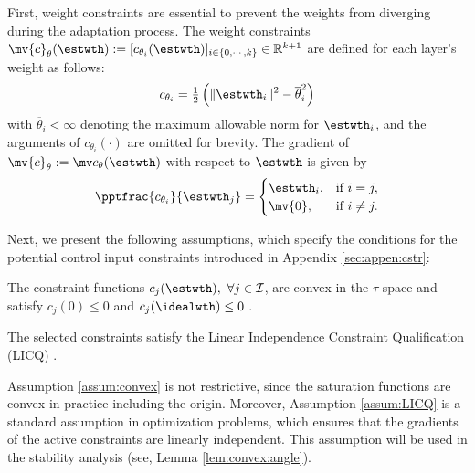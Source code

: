 \documentclass[lettersize,journal]{IEEEtran}
\begin{document}
First, weight constraints are essential to prevent the weights from diverging during the adaptation process.
The weight constraints $\mv{c}_{\theta}(\estwth):= [c_{\theta_i}(\estwth)]_{i\in\{0,\cdots ,k\}}\in\mathbb R^{k+1}$ are defined for each layer's weight as follows:
\begin{equation}
    c_{\theta_i}
    =
    \tfrac{1}{2}
    \left(
        \Vert \estwth_i\Vert^2 
        -
        \overline\theta_i^2 
    \right)    
    \label{eq:cstr:weight:ball}
\end{equation}
with $\overline\theta_i<\infty$ denoting the maximum allowable norm for $\estwth_i$, and the arguments of $c_{\theta_i}(\cdot)$ are omitted for brevity.
The gradient of $\mv{c}_\theta:=\mv c_{\theta}(\estwth)$ with respect to $\estwth$ is given by
\begin{equation}
    \pptfrac{c_{\theta_i}}{\estwth_j} 
    =
    \begin{cases}
        \estwth_i,
        &
        \text{if } i=j,
        \\
        \mv{0},
        &
        \text{if } i\ne j
        .
    \end{cases} 
    \label{eq:cstr:weight:ball:grad}
\end{equation}

Next, we present the following assumptions, which specify the conditions for the potential control input constraints introduced in Appendix \ref{sec:appen:cstr}:

\begin{assum}
    The constraint functions $c_j(\estwth),\ \forall j\in\mathcal I$, are convex in the $\tau$-space and satisfy $c_j(0) \le 0$ \color{red} and $c_j(\idealwth)\le 0$ \color{black}. 
    \label{assum:convex}
\end{assum}

\begin{assum}
    The selected constraints satisfy the Linear Independence Constraint Qualification (LICQ) \cite[Chap.~12 Def.~12.1]{Nocedal:2006aa}.
    \label{assum:LICQ}
\end{assum}

\begin{remark}
    Assumption \ref{assum:convex} is not restrictive, since the saturation functions are convex in practice including the origin.
    Moreover, Assumption \ref{assum:LICQ} is a standard assumption in optimization problems, which ensures that the gradients of the active constraints are linearly independent.
    This assumption will be used in the stability analysis (see, Lemma \ref{lem:convex:angle}).
\end{remark}
\end{document}
